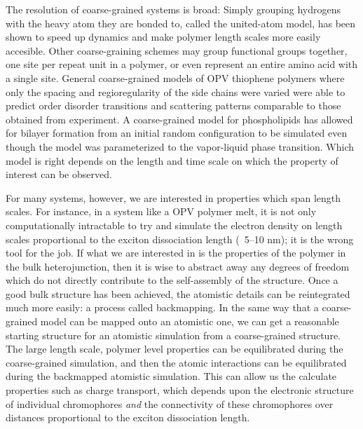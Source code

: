 The resolution of coarse-grained systems is broad:
Simply grouping hydrogens with the heavy atom they are bonded to, called the united-atom model, has been shown to speed up dynamics and make polymer length scales more easily accesible\cite{Paul1995a, Yang2006a}.
Other coarse-graining schemes may group functional groups together\cite{Berendsen2010, Jankowski2013, Marsh2014}, one site per repeat unit in a polymer\cite{Lee2011}, or even represent an entire amino acid with a single site\cite{Peng2019}.
General coarse-grained models of OPV thiophene polymers where only the spacing and regioregularity of the side chains were varied were able to predict order disorder transitions and scattering patterns comparable to those obtained from experiment\cite{Jankowski2013, Marsh2014}.
A coarse-grained model for phospholipids has allowed for bilayer formation from an initial random configuration to be simulated even though the model was parameterized to the vapor-liquid phase transition\cite{Shelley2001}.
Which model is right depends on the length and time scale on which the property of interest can be observed.

For many systems, however, we are interested in properties which span length scales.
For instance, in a system like a OPV polymer melt, it is not only computationally intractable to try and simulate the electron density on length scales proportional to the exciton dissociation length (~5--10 nm)\cite{Huang2010}; it is the wrong tool for the job.
If what we are interested in is the properties of the polymer in the bulk heterojunction, then it is wise to abstract away any degrees of freedom which do not directly contribute to the self-assembly of the structure.
Once a good bulk structure has been achieved, the atomistic details can be reintegrated much more easily: a process called backmapping.
In the same way that a coarse-grained model can be mapped onto an atomistic one, we can get a reasonable starting structure for an atomistic simulation from a coarse-grained structure.
The large length scale, polymer level properties can be equilibrated during the coarse-grained simulation, and then the atomic interactions can be equilibrated during the backmapped atomistic simulation.
This can allow us the calculate properties such as charge transport, which depends upon the electronic structure of individual chromophores \textit{and} the connectivity of these chromophores over distances proportional to the exciton dissociation length.

